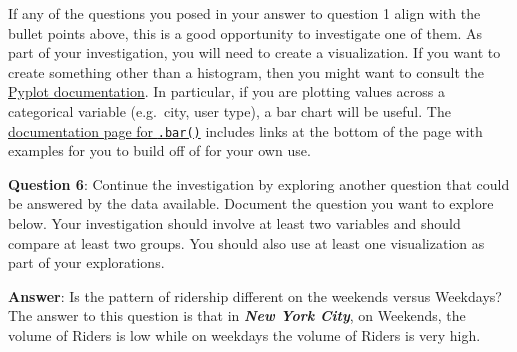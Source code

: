 \documentclass[11pt]{article}
\begin{document}
If any of the questions you posed in your answer to question 1 align
with the bullet points above, this is a good opportunity to investigate
one of them. As part of your investigation, you will need to create a
visualization. If you want to create something other than a histogram,
then you might want to consult the
\href{https://matplotlib.org/devdocs/api/pyplot_summary.html}{Pyplot
documentation}. In particular, if you are plotting values across a
categorical variable (e.g.~city, user type), a bar chart will be useful.
The
\href{https://matplotlib.org/devdocs/api/_as_gen/matplotlib.pyplot.bar.html\#matplotlib.pyplot.bar}{documentation
page for \texttt{.bar()}} includes links at the bottom of the page with
examples for you to build off of for your own use.

\textbf{Question 6}: Continue the investigation by exploring another
question that could be answered by the data available. Document the
question you want to explore below. Your investigation should involve at
least two variables and should compare at least two groups. You should
also use at least one visualization as part of your explorations.

\textbf{Answer}: Is the pattern of ridership different on the weekends
versus Weekdays? The answer to this question is that in
\textbf{\emph{New York City}}, on Weekends, the volume of Riders is low
while on weekdays the volume of Riders is very high.
\end{document}
